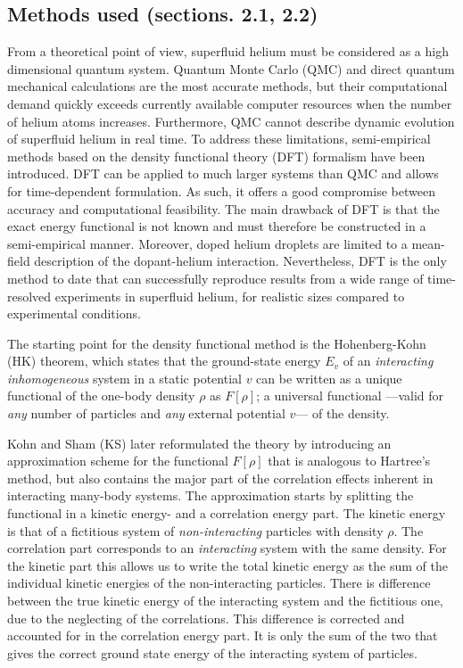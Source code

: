 	\subsection*{Methods used (sections. 2.1, 2.2)}
		From a theoretical point of view, superfluid helium must be considered as a high dimensional quantum system. Quantum Monte Carlo\citep{Kro02} (QMC) and direct quantum mechanical \citep{deL06,deL10,Agu13} calculations are the most accurate methods, but their computational demand quickly exceeds currently available computer resources when the number of helium atoms increases. Furthermore, QMC cannot describe dynamic evolution of superfluid helium in real time. To address these limitations, semi-empirical methods based on the density functional theory (DFT) formalism have been introduced\citep{Str87a,Str87b,Dal95}. DFT can be applied to much larger systems than QMC and allows for time-dependent formulation. As such, it offers a good compromise between accuracy and computational feasibility. The main drawback of DFT is that the exact energy functional is not known and must therefore be constructed in a semi-empirical manner. Moreover, doped helium droplets are limited to a mean-field description of the dopant-helium interaction. Nevertheless, DFT is the only method to date that can successfully reproduce results from a wide range of time-resolved experiments in superfluid helium, for realistic sizes compared to experimental conditions.
		
		The starting point for the density functional method is the Hohenberg-Kohn (HK) theorem\citep{Hohenberg1964}, which states that the ground-state energy $E_v$ of an \emph{interacting inhomogeneous} system in a static potential $v$ can be written as a unique functional of the one-body density $\rho$ as $F[\rho]$; a universal functional ---valid for \emph{any} number of particles and \emph{any} external potential $v$--- of the density.
		
		Kohn and Sham (KS) later reformulated\citep{Kohn1965} the theory by introducing an approximation scheme for the functional $F[\rho]$ that is analogous to Hartree's method, but also contains the major part of the correlation effects inherent in interacting many-body systems. The approximation starts by splitting the functional in a kinetic energy- and a correlation energy part. The kinetic energy is that of a fictitious system of \emph{non-interacting} particles with density $\rho$. The correlation part corresponds to an \emph{interacting} system with the same density. For the kinetic part this allows us to write the total kinetic energy as the sum of the individual kinetic energies of the non-interacting particles. There is difference between the true kinetic energy of the interacting system and the fictitious one, due to the neglecting of the correlations. This difference is corrected and accounted for in the correlation energy part. It is only the sum of the two that gives the correct ground state energy of the interacting system of particles.
		
